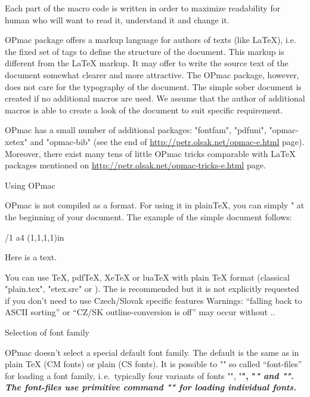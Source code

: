 Each part of the macro code is written in order to maximize readability for
human who will want to read it, understand it and change it. 

OPmac package offers a markup language for authors of texts (like \LaTeX),
i.e. the fixed set of tags to define the structure of the document. This
markup is different from the \LaTeX{} markup. It may offer to write the
source text of the document somewhat clearer and more attractive. The OPmac
package, however, does not care for the typography of the document. The simple
sober document is created if no additional macros are used. We assume that
the author of additional macros is able to create a look of the document to
suit specific requirement.

OPmac has a small number of additional packages: "fontfam", "pdfuni",
"opmac-xetex" and "opmac-bib" (see the end of
\url{http://petr.olsak.net/opmac-e.html} page). Moreover, there exist many
tens of little OPmac tricks comparable with \LaTeX{} packages mentioned on
\url{http://petr.olsak.net/opmac-tricks-e.html} page.


\sec Using OPmac

OPmac is not compiled as a format. For using it in plain\TeX{}, you can simply
" at the beginning of your document. The example of the simple
document follows:

\begtt

\typosize[11/13]   %
\margins/1 a4 (1,1,1,1)in   %

Here is a text.
\bye
\endtt

You can use \TeX, pdf\TeX, Xe\TeX{} or lua\TeX{} with plain \TeX{} format 
(classical "plain.tex", "etex.src" or \csplain{}).
The \csplain{} is recommended but it is not explicitly requested if you
don't need to use Czech/Slovak specific features\fnote
{Warnings: ``falling back to ASCII sorting''
or ``CZ/SK outline-conversion is off'' may occur without \csplain{}.}.


\sec Selection of font family

OPmac doesn't select a special default font family. The default is the same as in
plain \TeX{} (CM fonts) or \CS{}plain (CS fonts). It is possible to ""
so called ``font-files'' for loading a font family, i.\,e.\ typically four
variants of fonts "\rm", "\bf", "\it" and "\bi". The font-files use
primitive command "\font" for loading individual fonts.

